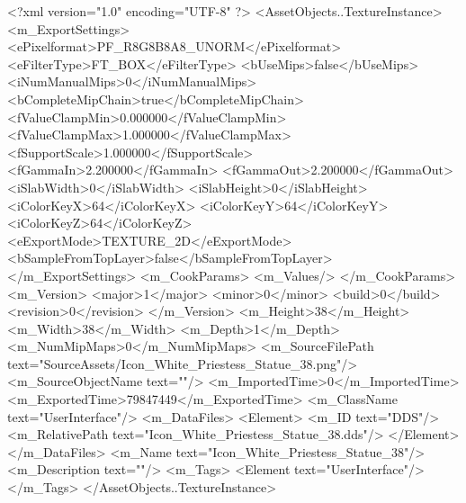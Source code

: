 <?xml version="1.0" encoding="UTF-8" ?>
<AssetObjects..TextureInstance>
	<m_ExportSettings>
		<ePixelformat>PF_R8G8B8A8_UNORM</ePixelformat>
		<eFilterType>FT_BOX</eFilterType>
		<bUseMips>false</bUseMips>
		<iNumManualMips>0</iNumManualMips>
		<bCompleteMipChain>true</bCompleteMipChain>
		<fValueClampMin>0.000000</fValueClampMin>
		<fValueClampMax>1.000000</fValueClampMax>
		<fSupportScale>1.000000</fSupportScale>
		<fGammaIn>2.200000</fGammaIn>
		<fGammaOut>2.200000</fGammaOut>
		<iSlabWidth>0</iSlabWidth>
		<iSlabHeight>0</iSlabHeight>
		<iColorKeyX>64</iColorKeyX>
		<iColorKeyY>64</iColorKeyY>
		<iColorKeyZ>64</iColorKeyZ>
		<eExportMode>TEXTURE_2D</eExportMode>
		<bSampleFromTopLayer>false</bSampleFromTopLayer>
	</m_ExportSettings>
	<m_CookParams>
		<m_Values/>
	</m_CookParams>
	<m_Version>
		<major>1</major>
		<minor>0</minor>
		<build>0</build>
		<revision>0</revision>
	</m_Version>
	<m_Height>38</m_Height>
	<m_Width>38</m_Width>
	<m_Depth>1</m_Depth>
	<m_NumMipMaps>0</m_NumMipMaps>
	<m_SourceFilePath text="SourceAssets/Icon_White_Priestess_Statue_38.png"/>
	<m_SourceObjectName text=""/>
	<m_ImportedTime>0</m_ImportedTime>
	<m_ExportedTime>79847449</m_ExportedTime>
	<m_ClassName text="UserInterface"/>
	<m_DataFiles>
		<Element>
			<m_ID text="DDS"/>
			<m_RelativePath text="Icon_White_Priestess_Statue_38.dds"/>
		</Element>
	</m_DataFiles>
	<m_Name text="Icon_White_Priestess_Statue_38"/>
	<m_Description text=""/>
	<m_Tags>
		<Element text="UserInterface"/>
	</m_Tags>
</AssetObjects..TextureInstance>
